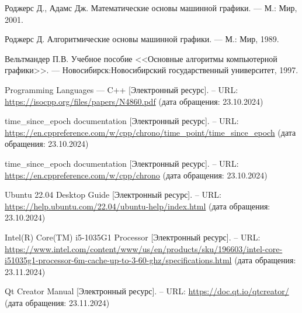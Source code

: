 
\renewcommand\bibname{СПИСОК ИСПОЛЬЗОВАННЫХ ИСТОЧНИКОВ}
\begin{thebibliography}{}

 Роджерс Д., Адамс Дж. Математические основы машинной графики. --- М.: Мир, 2001.

 Роджерс Д. Алгоритмические основы машинной графики. --- М.: Мир, 1989.

 Вельтмандер П.В. Учебное пособие <<Основные алгоритмы компьютерной графики>>. –-- Новосибирск:Новосибирский государственный университет, 1997.

 Programming Languages –-- C++ [Электронный ресурс]. -- URL: \url{https://isocpp.org/files/papers/N4860.pdf} (дата обращения: 23.10.2024)

 time\_since\_epoch documentation [Электронный ресурс]. -- URL: \url{https://en.cppreference.com/w/cpp/chrono/time_point/time_since_epoch} (дата обращения: 23.10.2024)

 time\_since\_epoch documentation [Электронный ресурс]. -- URL: \url{https://en.cppreference.com/w/cpp/chrono} (дата обращения: 23.10.2024)

 Ubuntu 22.04 Desktop Guide [Электронный ресурс]. -- URL: \url{https://help.ubuntu.com/22.04/ubuntu-help/index.html} (дата обращения: 23.10.2024)

 Intel(R) Core(TM) i5-1035G1 Processor [Электронный ресурс]. -- URL: \url{https://www.intel.com/content/www/us/en/products/sku/196603/intel-core-i51035g1-processor-6m-cache-up-to-3-60-ghz/specifications.html} (дата обращения: 23.11.2024)

 Qt Creator Manual [Электронный ресурс]. -- URL: \url{https://doc.qt.io/qtcreator/} (дата обращения: 23.11.2024)

\end{thebibliography}